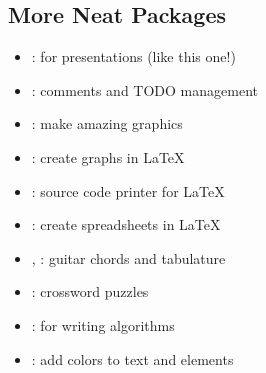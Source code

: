 \documentclass[aspectratio=169]{beamer}
\begin{document}
\subsection{More Neat Packages}
\begin{frame}{\insertsubsection}
\begin{itemize}
\item {}: for presentations (like this one!)
\item {}: comments and TODO management
\item {}: make amazing graphics
\item {}: create graphs in \LaTeX
\item {}: source code printer for \LaTeX
\item {}: create spreadsheets in \LaTeX
\item {}, : guitar chords and tabulature
\item {}: crossword puzzles
\item {}: for writing algorithms
\item {}: add colors to text and elements
\end{itemize}
\end{frame}

\end{document}
